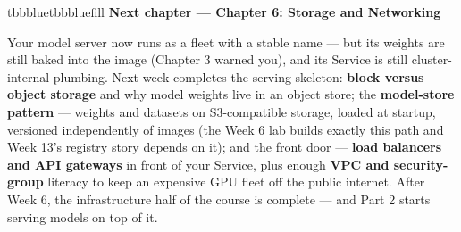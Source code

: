 \vspace{5.0pt}

\begin{calloutbox}{tbbblue}{tbbbluefill}
{\normalsize\bfseries\color{tbbblue}Next chapter — Chapter 6: Storage and Networking}\par\vspace{3pt}
Your model server now runs as a fleet with a stable name — but its weights are still baked into the image (Chapter 3 warned you), and its Service is still cluster-internal plumbing. Next week completes the serving skeleton: \textbf{block versus object storage} and why model weights live in an object store; the \textbf{model-store pattern} — weights and datasets on S3-compatible storage, loaded at startup, versioned independently of images (the Week 6 lab builds exactly this path and Week 13's registry story depends on it); and the front door — \textbf{load balancers and API gateways} in front of your Service, plus enough \textbf{VPC and security-group} literacy to keep an expensive GPU fleet off the public internet. After Week 6, the infrastructure half of the course is complete — and Part 2 starts serving models on top of it.
\end{calloutbox}
